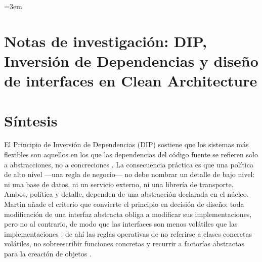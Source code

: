 
\begingroup\emergencystretch=3em 
\section*{Notas de investigación: DIP, Inversión de Dependencias y diseño de interfaces en Clean Architecture}

\section{Síntesis}

El Principio de Inversión de Dependencias (DIP) sostiene que los sistemas más flexibles son
aquellos en los que las dependencias del código fuente se refieren solo a abstracciones, no a
concreciones \parencite[87]{martin2017}. La consecuencia práctica es que una política de alto
nivel —una regla de negocio— no debe nombrar un detalle de bajo nivel: ni una base de datos, ni
un servicio externo, ni una librería de transporte. Ambos, política y detalle, dependen de una
abstracción declarada en el núcleo. Martin añade el criterio que convierte el principio en
decisión de diseño: toda modificación de una interfaz abstracta obliga a modificar sus
implementaciones, pero no al contrario, de modo que las interfaces son menos volátiles que las
implementaciones \parencite[88]{martin2017}; de ahí las reglas operativas de no referirse a
clases concretas volátiles, no sobreescribir funciones concretas y recurrir a factorías
abstractas para la creación de objetos \parencite[89]{martin2017}.

